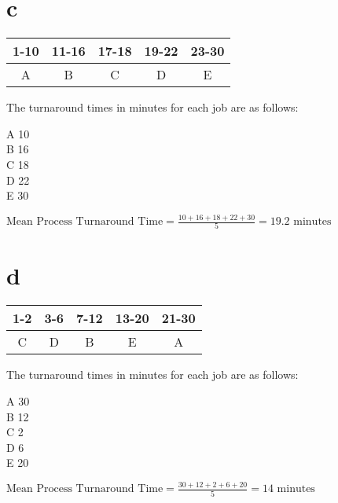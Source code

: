 	\part{c}
		\begin{tabular}{|c|c|c|c|c|}
			\hline
			1-10 & 11-16 & 17-18 & 19-22 & 23-30\\
			\hline
			A & B & C & D & E\\
			\hline
		\end{tabular}\par
		The turnaround times in minutes for each job are as follows:\par
		A 10\\
		B 16\\
		C 18\\
		D 22\\
		E 30\par
		$\text{Mean Process Turnaround Time} = \frac{10 + 16 + 18 + 22 + 30}{5} = 19.2 \text{ minutes}$

	\part{d}
		\begin{tabular}{|c|c|c|c|c|}
			\hline
			1-2 & 3-6 & 7-12 & 13-20 & 21-30\\
			\hline
			C & D & B & E & A\\
			\hline
		\end{tabular}\par
		The turnaround times in minutes for each job are as follows:\par
		A 30\\
		B 12\\
		C 2\\
		D 6\\
		E 20\par
		$\text{Mean Process Turnaround Time} = \frac{30 + 12 + 2 + 6 + 20}{5} = 14 \text{ minutes}$




